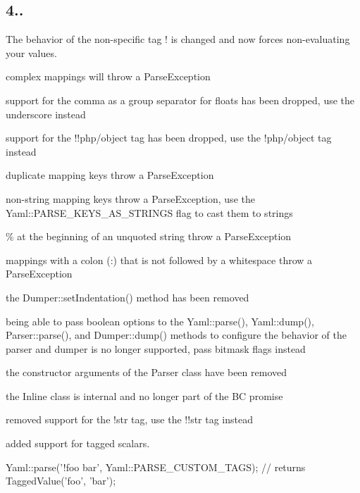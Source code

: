 \subsection*{4.. }


\begin{DoxyItemize}
\item The behavior of the non-\/specific tag {\ttfamily !} is changed and now forces non-\/evaluating your values.
\item complex mappings will throw a {\ttfamily Parse\+Exception}
\item support for the comma as a group separator for floats has been dropped, use the underscore instead
\item support for the {\ttfamily !!php/object} tag has been dropped, use the {\ttfamily !php/object} tag instead
\item duplicate mapping keys throw a {\ttfamily Parse\+Exception}
\item non-\/string mapping keys throw a {\ttfamily Parse\+Exception}, use the {\ttfamily Yaml\+::\+P\+A\+R\+S\+E\+\_\+\+K\+E\+Y\+S\+\_\+\+A\+S\+\_\+\+S\+T\+R\+I\+N\+GS} flag to cast them to strings
\item {\ttfamily \%} at the beginning of an unquoted string throw a {\ttfamily Parse\+Exception}
\item mappings with a colon ({\ttfamily \+:}) that is not followed by a whitespace throw a {\ttfamily Parse\+Exception}
\item the {\ttfamily Dumper\+::set\+Indentation()} method has been removed
\item being able to pass boolean options to the {\ttfamily Yaml\+::parse()}, {\ttfamily Yaml\+::dump()}, {\ttfamily Parser\+::parse()}, and {\ttfamily Dumper\+::dump()} methods to configure the behavior of the parser and dumper is no longer supported, pass bitmask flags instead
\item the constructor arguments of the {\ttfamily Parser} class have been removed
\item the {\ttfamily Inline} class is internal and no longer part of the BC promise
\item removed support for the {\ttfamily !str} tag, use the {\ttfamily !!str} tag instead
\item added support for tagged scalars.
\end{DoxyItemize}


\begin{DoxyCode}
Yaml::parse('!foo bar', Yaml::PARSE\_CUSTOM\_TAGS);
// returns TaggedValue('foo', 'bar');
\end{DoxyCode}



